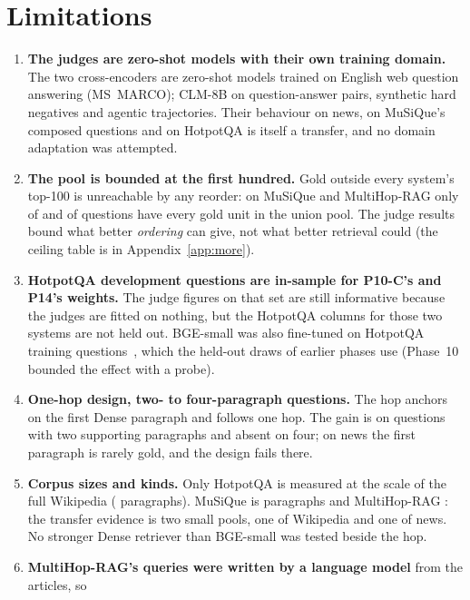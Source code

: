 \section{Limitations}
\label{sec:limits}

\begin{enumerate}
  \item \textbf{The judges are zero-shot models with their own training domain.} The two
        cross-encoders are zero-shot models trained on English web question answering
        (MS~MARCO); CLM-8B on question-answer pairs, synthetic hard negatives and agentic
        trajectories. Their behaviour on news, on MuSiQue's composed
        questions and on HotpotQA is itself a transfer, and no domain adaptation was attempted.
  \item \textbf{The pool is bounded at the first hundred.} Gold outside every system's top-100
        is unreachable by any reorder: on MuSiQue and MultiHop-RAG only \ceilUnionMusique{} of
        \nQuestionsMusique{} and \ceilUnionMultihop{} of \nQuestionsMultihop{} questions have every gold unit
        in the union pool. The judge results bound what better \emph{ordering} can give, not what
        better retrieval could (the ceiling table is in Appendix~\ref{app:more}).
  \item \textbf{HotpotQA development questions are in-sample for P10-C's and P14's weights.}
        The judge figures on that set are still informative because the judges are fitted on
        nothing, but the HotpotQA columns for those two systems are not held out. BGE-small was
        also fine-tuned on HotpotQA training questions~\citep{xiao2024cpack}, which the held-out
        draws of earlier phases use (Phase~10 bounded the effect with a probe).
  \item \textbf{One-hop design, two- to four-paragraph questions.} The hop anchors on the first
        Dense paragraph and follows one hop. The gain is on questions with two supporting
        paragraphs and absent on four; on news the first paragraph is rarely gold, and the design
        fails there.
  \item \textbf{Corpus sizes and kinds.} Only HotpotQA is measured at the scale of the full
        Wikipedia (\hopCostNineUnits{} paragraphs). MuSiQue is \hopCostFifteenUnits{} paragraphs and
        MultiHop-RAG \hopCostSixteenUnits{}: the transfer evidence is two small pools, one of
        Wikipedia and one of news. No stronger Dense retriever than BGE-small was tested beside
        the hop.
  \item \textbf{MultiHop-RAG's queries were written by a language model} from the articles, so

\end{enumerate}
